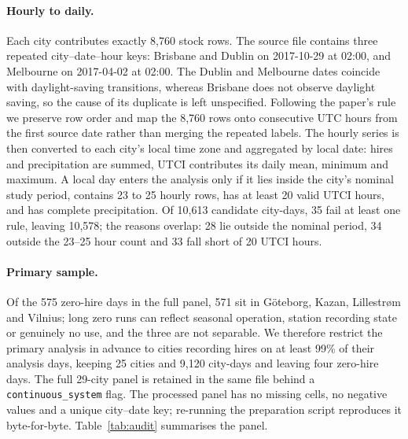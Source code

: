 \documentclass{article}
\begin{document}
\paragraph{Hourly to daily.} Each city contributes exactly 8{,}760 stock rows.
The source file contains three repeated city--date--hour keys: Brisbane and
Dublin on 2017-10-29 at 02:00, and Melbourne on 2017-04-02 at 02:00. The Dublin
and Melbourne dates coincide with daylight-saving transitions, whereas Brisbane
does not observe daylight saving, so the cause of its duplicate is left
unspecified. Following the paper's rule we preserve row
order and map the 8{,}760 rows onto consecutive UTC hours from the first source
date rather than merging the repeated labels. The hourly series is then converted
to each city's local time zone and aggregated by local date: hires and
precipitation are summed, UTCI contributes its daily mean, minimum and maximum. A
local day enters the analysis only if it lies inside the city's nominal study
period, contains 23 to 25 hourly rows, has at least 20 valid UTCI hours, and has
complete precipitation. Of 10{,}613 candidate city-days, 35 fail at least one
rule, leaving 10{,}578; the reasons overlap: 28 lie outside the nominal period,
34 outside the 23--25 hour count and 33 fall short of 20 UTCI hours.

\paragraph{Primary sample.} Of the 575 zero-hire days in the full panel, 571 sit
in G{\"o}teborg, Kazan, Lillestr{\o}m and Vilnius; long zero runs can reflect
seasonal operation, station recording state or genuinely no use, and the three
are not separable. We therefore restrict the primary analysis in advance to
cities recording hires on at least 99\% of their analysis days, keeping 25 cities
and 9{,}120 city-days and leaving four zero-hire days. The full 29-city panel is
retained in the same file behind a \texttt{continuous\_system} flag. The
processed panel has no missing cells, no negative values and a unique
city--date key; re-running the preparation script reproduces it byte-for-byte.
Table~\ref{tab:audit} summarises the panel.
\end{document}
